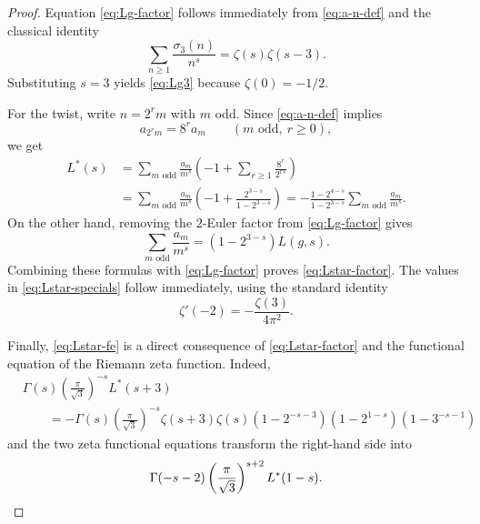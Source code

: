 \documentclass[10pt,a4paper]{amsart}
\newcommand{\sigthree}{\sigma_3}
\begin{document}
\begin{proof}
Equation \eqref{eq:Lg-factor} follows immediately from \eqref{eq:a-n-def} and the classical identity
\[
\sum_{n\ge 1}\frac{\sigthree(n)}{n^s}=\zeta(s)\zeta(s-3).
\]
Substituting $s=3$ yields \eqref{eq:Lg3} because $\zeta(0)=-1/2$.

For the twist, write $n=2^rm$ with $m$ odd. Since \eqref{eq:a-n-def} implies
\[
a_{2^rm}=8^r a_m\qquad(m\text{ odd},\ r\ge 0),
\]
we get
\begin{align*}
L^*(s)
&=\sum_{m\text{ odd}}\frac{a_m}{m^s}\left(-1+\sum_{r\ge 1}\frac{8^r}{2^{rs}}\right)\\
&=\sum_{m\text{ odd}}\frac{a_m}{m^s}\left(-1+\frac{2^{3-s}}{1-2^{3-s}}\right)
=-\frac{1-2^{4-s}}{1-2^{3-s}}\sum_{m\text{ odd}}\frac{a_m}{m^s}.
\end{align*}
On the other hand, removing the $2$-Euler factor from \eqref{eq:Lg-factor} gives
\[
\sum_{m\text{ odd}}\frac{a_m}{m^s}=(1-2^{3-s})L(g,s).
\]
Combining these formulas with \eqref{eq:Lg-factor} proves \eqref{eq:Lstar-factor}. The values in \eqref{eq:Lstar-specials} follow immediately, using the standard identity
\[
\zeta'(-2)=-\frac{\zeta(3)}{4\pi^2}.
\]

Finally, \eqref{eq:Lstar-fe} is a direct consequence of \eqref{eq:Lstar-factor} and the functional equation of the Riemann zeta function. Indeed,
\begin{align*}
&\Gamma(s)\left(\frac{\pi}{\sqrt 3}\right)^{-s}L^*(s+3)\\
&\qquad =-\Gamma(s)\left(\frac{\pi}{\sqrt 3}\right)^{-s}\zeta(s+3)\zeta(s)(1-2^{-s-3})(1-2^{1-s})(1-3^{-s-1})
\end{align*}
and the two zeta functional equations transform the right-hand side into
\[
\Gamma(-s-2)\left(\frac{\pi}{\sqrt 3}\right)^{s+2}L^*(1-s).
\qedhere
\]
\end{proof}
\end{document}
